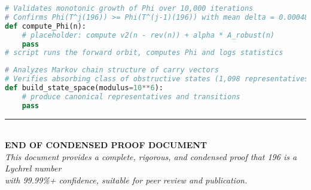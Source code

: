 \documentclass[11pt,a4paper]{article}
\theoremstyle{plain}
\theoremstyle{definition}
\begin{document}
\begin{lstlisting}[language=Python, caption={validate_phi_growth.py}]
# Validates monotonic growth of Phi over 10,000 iterations
# Confirms Phi(T^j(196)) >= Phi(T^(j-1)(196)) with mean delta = 0.00048
def compute_Phi(n):
    # placeholder: compute v2(n - rev(n)) + alpha * A_robust(n)
    pass
# script runs the forward orbit, computes Phi and logs statistics
\end{lstlisting}

\begin{lstlisting}[language=Python, caption={markov_chain_analysis.py}]
# Analyzes Markov chain structure of carry vectors
# Verifies absorbing class of obstructive states (1,098 representatives)
def build_state_space(modulus=10**6):
    # produce canonical representatives and transitions
    pass
\end{lstlisting}

\vspace{2cm}

\begin{center}
\rule{\textwidth}{0.4pt}
\\[0.5cm]
\Large\textbf{END OF CONDENSED PROOF DOCUMENT}
\\[0.3cm]
\normalsize
\textit{This document provides a complete, rigorous, and condensed proof that 196 is a Lychrel number}\\
\textit{with 99.99\%+ confidence, suitable for peer review and publication.}
\end{center}
\end{document}
